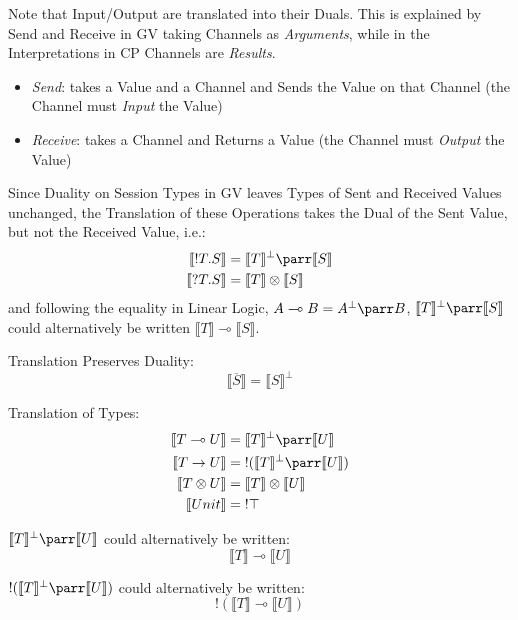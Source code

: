 \fist Note that Input/Output are translated into their Duals. This is
explained by Send and Receive in GV taking Channels as
\emph{Arguments}, while in the Interpretations in CP Channels are
\emph{Results}.
\begin{itemize}
  \item \emph{Send}: takes a Value and a Channel and Sends the Value
    on that Channel (the Channel must \emph{Input} the Value)
  \item \emph{Receive}: takes a Channel and Returns a Value (the
    Channel must \emph{Output} the Value)
\end{itemize}
Since Duality on Session Types in GV leaves Types of Sent and Received
Values unchanged, the Translation of these Operations takes the Dual
of the Sent Value, but not the Received Value, i.e.:
\begin{align*}
  \llbracket !T.S \rrbracket &=
    \llbracket T \rrbracket^\bot \parr \llbracket S \rrbracket \\
  \llbracket ?T.S \rrbracket &=
    \llbracket T \rrbracket \otimes \llbracket S \rrbracket
\end{align*}
and following the equality in Linear Logic, $A \multimap B = A^\bot
\parr B$, $\llbracket T \rrbracket^\bot \parr \llbracket S \rrbracket$
could alternatively be written $\llbracket T \rrbracket \multimap
\llbracket S \rrbracket$.

Translation Preserves Duality:
\[
  \llbracket \overline{S} \rrbracket = \llbracket S \rrbracket^\bot
\]

Translation of Types:
\begin{align*}
  \llbracket T \multimap U \rrbracket &=
    \llbracket T \rrbracket^\bot \parr \llbracket U \rrbracket \\
  \llbracket T \rightarrow U \rrbracket &=
    \;!(\llbracket T \rrbracket^\bot \parr \llbracket U \rrbracket) \\
  \llbracket T \otimes U \rrbracket &=
    \llbracket T \rrbracket \otimes \llbracket U \rrbracket \\
  \llbracket Unit \rrbracket &= \;!\top
\end{align*}

$\llbracket T \rrbracket^\bot \parr \llbracket U \rrbracket$ could
alternatively be written:
\[
  \llbracket T \rrbracket \multimap \llbracket U \rrbracket
\]

$!(\llbracket T \rrbracket^\bot \parr \llbracket U \rrbracket)$ could
alternatively be written:
\[
  !(\llbracket T \rrbracket \multimap \llbracket U \rrbracket)
\]


